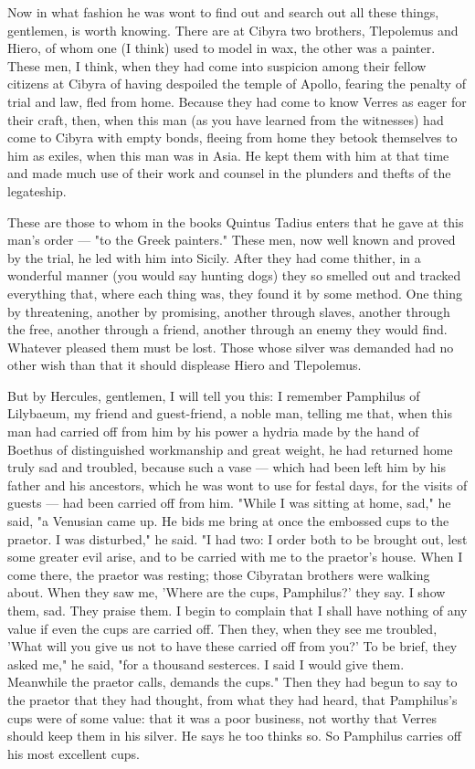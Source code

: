  Now in what fashion he was wont to find out and search out all these things, gentlemen, is worth knowing. There are at Cibyra two brothers, Tlepolemus and Hiero, of whom one (I think) used to model in wax, the other was a painter. These men, I think, when they had come into suspicion among their fellow citizens at Cibyra of having despoiled the temple of Apollo, fearing the penalty of trial and law, fled from home. Because they had come to know Verres as eager for their craft, then, when this man (as you have learned from the witnesses) had come to Cibyra with empty bonds, fleeing from home they betook themselves to him as exiles, when this man was in Asia. He kept them with him at that time and made much use of their work and counsel in the plunders and thefts of the legateship.

 These are those to whom in the books Quintus Tadius enters that he gave at this man's order --- "to the Greek painters." These men, now well known and proved by the trial, he led with him into Sicily. After they had come thither, in a wonderful manner (you would say hunting dogs) they so smelled out and tracked everything that, where each thing was, they found it by some method. One thing by threatening, another by promising, another through slaves, another through the free, another through a friend, another through an enemy they would find. Whatever pleased them must be lost. Those whose silver was demanded had no other wish than that it should displease Hiero and Tlepolemus.

 But by Hercules, gentlemen, I will tell you this: I remember Pamphilus of Lilybaeum, my friend and guest-friend, a noble man, telling me that, when this man had carried off from him by his power a hydria made by the hand of Boethus of distinguished workmanship and great weight, he had returned home truly sad and troubled, because such a vase --- which had been left him by his father and his ancestors, which he was wont to use for festal days, for the visits of guests --- had been carried off from him. "While I was sitting at home, sad," he said, "a Venusian came up. He bids me bring at once the embossed cups to the praetor. I was disturbed," he said. "I had two: I order both to be brought out, lest some greater evil arise, and to be carried with me to the praetor's house. When I come there, the praetor was resting; those Cibyratan brothers were walking about. When they saw me, 'Where are the cups, Pamphilus?' they say. I show them, sad. They praise them. I begin to complain that I shall have nothing of any value if even the cups are carried off. Then they, when they see me troubled, 'What will you give us not to have these carried off from you?' To be brief, they asked me," he said, "for a thousand sesterces. I said I would give them. Meanwhile the praetor calls, demands the cups." Then they had begun to say to the praetor that they had thought, from what they had heard, that Pamphilus's cups were of some value: that it was a poor business, not worthy that Verres should keep them in his silver. He says he too thinks so. So Pamphilus carries off his most excellent cups.

